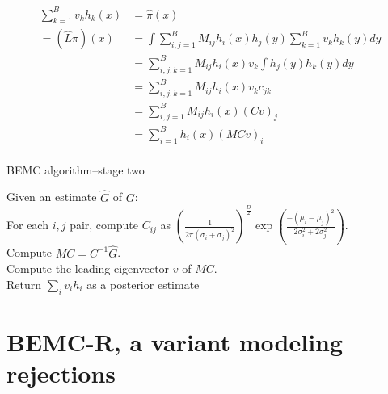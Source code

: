 \documentclass{article}
\newcommand\EMK[1]{\textcolor{purple}{EMK: #1}}
\begin{document}
\begin{align*}
 \sum_{k=1}^Bv_kh_k(x)&=\hat{\pi}(x) \\
= (\hat{L}\hat{\pi})(x) &= \int \sum_{i,j=1}^B M_{ij} h_i(x)h_j(y) \sum_{k=1}^Bv_kh_k(y)dy\\
&=  \sum_{i,j,k=1}^B M_{ij} h_i(x)v_k\int h_j(y)h_k(y)dy\\
&=  \sum_{i,j,k=1}^B M_{ij} h_i(x)v_kc_{jk}\\
&=  \sum_{i,j=1}^B M_{ij} h_i(x)(Cv)_j\\
&=  \sum_{i=1}^B h_i(x)(MCv)_i\\
\end{align*}


\begin{algorithm}[h]
\caption{BEMC algorithm--stage two}
Given an estimate $\hat{G}$ of $G$:\\
For each $i,j$ pair, compute $C_{ij}$ as $(\frac{1}{2\pi (\sigma_i+\sigma_j)^2})^{\frac{D}{2}}\exp(\frac{-(\mu_i-\mu_j)^2}{2\sigma_i^2+2\sigma_j^2})$.\\
Compute ${M}C=C^{-1}\hat{G}$.\\
Compute the leading eigenvector $v$ of $MC$. \\
Return $\sum_i v_i h_i$ as a posterior estimate\\
\end{algorithm}


\section{BEMC-R, a variant modeling rejections}
\label{sec:BEMC-R}
\end{document}
